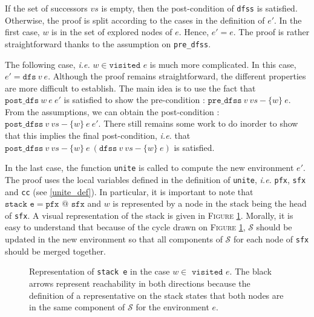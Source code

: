 \documentclass[a4 paper, 12pt]{article}
\begin{document}
{If the set of successors $vs$ is empty, then the post-condition of \texttt{dfss} is satisfied.
Otherwise, the proof is split according to the cases in the definition of $e'$. In the first case, $w$ is in the set of explored nodes of $e$. Hence, $e' = e$. The proof is rather straightforward thanks to the assumption on \texttt{pre\_dfss}.

\BlankLine

The following case, \textit{i.e.} $w \in \texttt{visited }e$ is much more complicated. In this case, $e' = \texttt{dfs}~v~e$. Although the proof remains straightforward, the different properties are more difficult to establish. The main idea is to use the fact that $\texttt{post\_dfs}~w~e~e'$ is satisfied to show the pre-condition : $\texttt{pre\_dfss}~v~vs-\{w\}~e$. From the assumptions, we can obtain the post-condition : $\texttt{post\_dfss}~v~vs-\{w\}~e~e'$. There still remains some work to do inorder to show that this implies the final post-condition, \textit{i.e.} that $\texttt{post\_dfss}~v~vs-\{w\}~e~(\texttt{dfss}~v~vs-\{w\}~e)$ is satisfied.

\BlankLine

In the last case, the function \texttt{unite} is called to compute the new environment $e'$. The proof uses the local variables defined in the definition of \texttt{unite}, \textit{i.e.} \texttt{pfx}, \texttt{sfx} and \texttt{cc} (see \ref{unite_def}). In particular, it is important to note that $\texttt{stack e} = \texttt{pfx } @ \texttt{ sfx}$ and $w$ is represented by a node in the stack being the head of \texttt{sfx}. A visual representation of the stack is given in \textsc{Figure \ref{fig:partial_correctness_unite}}. Morally, it is easy to understand that because of the cycle drawn on \textsc{Figure \ref{fig:partial_correctness_unite}}, $\mathcal{S}$ should be updated in the new environment so that all components of $\mathcal{S}$ for each node of \texttt{sfx} should be merged together.

\begin{figure}[!h]
    \caption{Representation of \texttt{stack e} in the case $w \in \texttt{ visited } e$. The black arrows represent reachability in both directions because the definition of a representative on the stack states that both nodes are in the same component of $\mathcal{S}$ for the environment $e$.}\label{fig:partial_correctness_unite}
\end{figure}

\BlankLine

}
\end{document}
